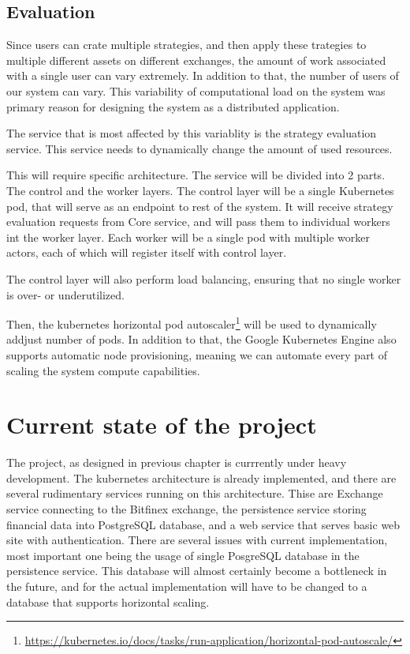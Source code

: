 \section{Evaluation}
Since users can crate multiple strategies, and then apply these trategies to multiple different assets on different exchanges,
the amount of work associated with a single user can vary extremely. In addition to that, the number of users of our system can vary.
This variability of computational load on the system was primary reason for designing the system as a distributed application.

The service that is most affected by this variablity is the strategy evaluation service. This service needs to
dynamically change the amount of used resources.

This will require specific architecture. The service will be divided into 2 parts. The control and the worker layers.
The control layer will be a single Kubernetes pod, that will serve as an endpoint to rest of the system. It will receive
strategy evaluation requests from Core service, and will pass them to individual workers int the worker layer.
Each worker will be a single pod with multiple worker actors, each of which will register itself with control layer.

The control layer will also perform load balancing, ensuring that no single worker is over- or underutilized.

Then, the kubernetes horizontal pod autoscaler\footnote{\url{https://kubernetes.io/docs/tasks/run-application/horizontal-pod-autoscale/}} will be used to dynamically addjust number of pods. In addition to that,
the Google Kubernetes Engine also supports automatic node provisioning, meaning we can automate every part of scaling the system
compute capabilities.

\chapter{Current state of the project}
The project, as designed in previous chapter is currrently under heavy development. The kubernetes architecture is already implemented,
and there are several rudimentary services running on this architecture. Thise are Exchange service connecting to the
Bitfinex exchange, the persistence service storing financial data into PostgreSQL database, and a web service
that serves basic web site with authentication. There are several issues with current implementation, most important one
being the usage of single PosgreSQL database in the persistence service. This database will almost certainly become a bottleneck
in the future, and for the actual implementation will have to be changed to a database that supports horizontal scaling.

